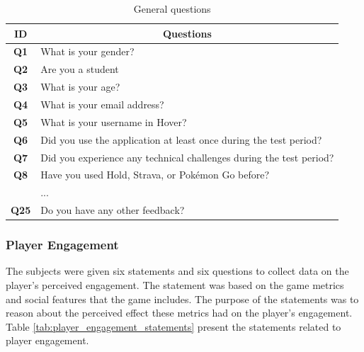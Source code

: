 \begin{table}[H]
    \centering
    \begin{tabularx}{0.95\textwidth}{|c|X|}
        \hline
        \textbf{ID} & \multicolumn{1}{c|}{\textbf{Questions}} \\ \hline
        \textbf{Q1} & What is your gender? \\
        \textbf{Q2} & Are you a student \\
        \textbf{Q3} & What is your age? \\
        \textbf{Q4} & What is your email address? \\
        \textbf{Q5} & What is your username in Hover? \\
        \textbf{Q6} & Did you use the application at least once during the test period? \\
        \textbf{Q7} & Did you experience any technical challenges during the test period? \\
        \textbf{Q8} & Have you used Hold, Strava, or Pokémon Go before? \\ 
        \textbf{} & ...  \\ 
        \textbf{Q25} & Do you have any other feedback?  \\ \hline
    \end{tabularx}
    \caption{General questions}
    \label{tab:general_questions}
\end{table}

\subsubsection{Player Engagement}
The subjects were given six statements and six questions to collect data on the player’s perceived engagement. The statement was based on the game metrics and social features that the game includes. The purpose of the statements was to reason about the perceived effect these metrics had on the player’s engagement. Table \ref{tab:player_engagement_statements} present the statements related to player engagement.

